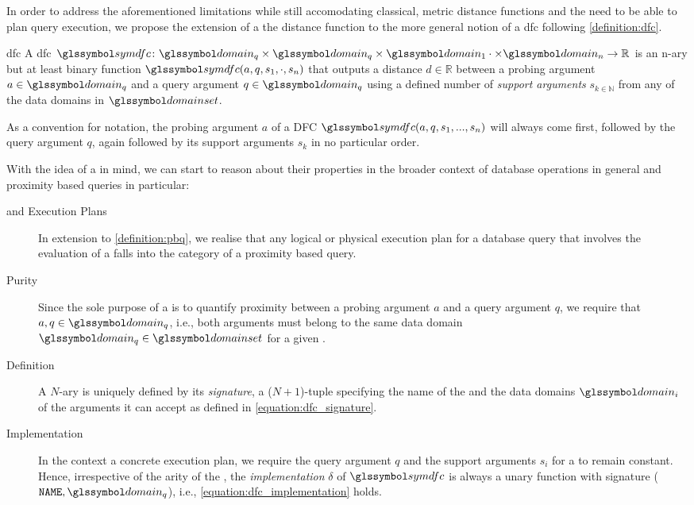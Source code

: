 In order to address the aforementioned limitations while still accomodating classical, metric distance functions and the need to be able to plan query execution, we propose the extension of a the distance function to the more general notion of a \gls{dfc} following \cref{definition:dfc}.

\begin{definition}[label=definition:dfc]{\gls{dfc}}{}
    A \gls{dfc} $\symdfc \colon \domain_q \times \domain_q \times \domain_{1} \cdot \times \domain_{n} \to \mathbb{R}$ is an n-ary but at least binary function $\symdfc(a,q,s_1,\cdot,s_n)$ that outputs a distance $d \in \mathbb{R}$ between a probing argument $a \in \domain_q$ and a query argument $q \in \domain_q$ using a defined number of \emph{support arguments} $s_{k \in \mathbb{N}}$ from any of the data domains in $\domainset$.
\end{definition}

As a convention for notation, the probing argument $a$ of a DFC $\symdfc(a,q,s_1,...,s_n)$ will always come first, followed by the query argument $q$, again followed by its support arguments $s_k$ in no particular order. 

With the idea of a  in mind, we can start to reason about their properties in the broader context of database operations in general and proximity based queries in particular:

\begin{description}

    \item[ and Execution Plans] In extension to \cref{definition:pbq}, we realise that any logical or physical execution plan for a database query that involves the evaluation of a  falls into the category of a proximity based query.

    \item[Purity] Since the sole purpose of a   is to quantify proximity between a probing argument $a$ and a query argument $q$, we require that $a, q \in \domain_q$, i.e., both arguments must belong to the same data domain $\domain_q \in \domainset$ for a given .

    \item[Definition] A $N$-ary   is uniquely defined by its \emph{signature}, a ($N+1$)-tuple specifying the name of the   and the data domains $\domain_i$ of the arguments it can accept as defined in \cref{equation:dfc_signature}. 

    \item[Implementation] In the context a concrete execution plan, we require the query argument $q$ and the support arguments $s_i$ for a   to remain constant. Hence, irrespective of the arity of the , the \emph{implementation} $\delta$ of  $\symdfc$ is always a unary function with signature ($\mathtt{NAME}, \domain_q$), i.e., \cref{equation:dfc_implementation} holds.
\end{description}

